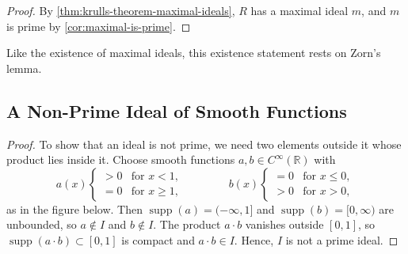 \begin{proof}
By \cref{thm:krulls-theorem-maximal-ideals}, $R$ has a maximal ideal $m$, and $m$ is prime by \cref{cor:maximal-is-prime}.
\end{proof}

Like the existence of maximal ideals, this existence statement rests on Zorn's lemma.

\subsection{A Non-Prime Ideal of Smooth Functions}


\begin{proof}
To show that an ideal is not prime, we need two elements outside it whose product lies inside it. Choose smooth functions $a, b \in C^\infty(\mathbb{R})$ with
\[
a(x) \begin{cases} > 0 & \text{for } x < 1, \\ = 0 & \text{for } x \ge 1, \end{cases}
\qquad\qquad
b(x) \begin{cases} = 0 & \text{for } x \le 0, \\ > 0 & \text{for } x > 0, \end{cases}
\]
as in the figure below. Then $\operatorname{supp}(a) = (-\infty, 1]$ and $\operatorname{supp}(b) = [0, \infty)$ are unbounded, so $a \notin I$ and $b \notin I$. The product $a \cdot b$ vanishes outside $[0, 1]$, so $\operatorname{supp}(a \cdot b) \subset [0, 1]$ is compact and $a \cdot b \in I$. Hence, $I$ is not a prime ideal.
\end{proof}

